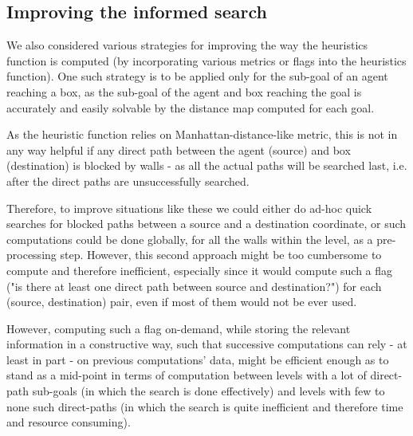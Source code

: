 \documentclass[letterpaper]{article}
\begin{document}
\subsection{Improving the informed search}
We also considered various strategies for improving the way the heuristics function is computed (by incorporating various metrics or flags into the heuristics function). One such strategy is to be applied only for the sub-goal of an agent reaching a box, as the sub-goal of the agent and box reaching the goal is accurately and easily solvable by the distance map computed for each goal.

As the heuristic function relies on Manhattan-distance-like metric, this is not in any way helpful if any direct path between the agent (source) and box (destination) is blocked by walls - as all the actual paths will be searched last, i.e. after the direct paths are unsuccessfully searched.

Therefore, to improve situations like these we could either do ad-hoc quick searches for blocked paths between a source and a destination coordinate, or such computations could be done globally, for all the walls within the level, as a pre-processing step. However, this second approach might be too cumbersome to compute and therefore inefficient, especially since it would compute such a flag ("is there at least one direct path between source and destination?") for each (source, destination) pair, even if most of them would not be ever used.

However, computing such a flag on-demand, while storing the relevant information in a constructive way, such that successive computations can rely - at least in part - on previous computations' data, might be efficient enough as to stand as a mid-point in terms of computation between levels with a lot of direct-path sub-goals (in which the search is done effectively) and levels with few to none such direct-paths (in which the search is quite inefficient and therefore time and resource consuming).
\end{document}
